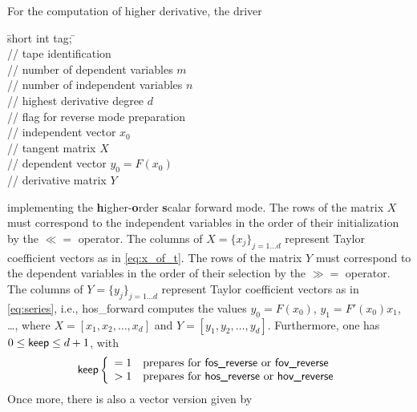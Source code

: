\documentclass[11pt,twoside]{article}
\begin{document}
For the computation of higher derivative, the driver
\begin{tabbing}
\hspace{0.5in}\={\sf short int tag;} \hspace{1.1in}\= \kill    %
\\
         \> // tape identification \\
                 \> // number of  dependent variables $m$\\
                 \> // number of independent variables $n$\\
                 \> // highest derivative degree $d$\\
              \> // flag for reverse mode preparation\\
          \> // independent vector $x_0$\\
        \> // tangent matrix $X$\\
          \> // dependent vector $y_0=F(x_0)$\\
        \> // derivative matrix $Y$
\end{tabbing}
implementing the  {\bf h}igher-{\bf o}rder {\bf s}calar forward mode.
The rows of the matrix $X$ must correspond to the independent variables in the order of their 
initialization by the \boldmath $\ll=$ \unboldmath operator. The columns of 
$X = \{x_j\}_{j=1\ldots d}$ represent Taylor coefficient vectors as in 
\eqref{eq:x_of_t}. The rows of the matrix $Y$ must correspond to the
dependent variables in the order of their selection by the \boldmath $\gg=$ \unboldmath operator.
The columns of $Y = \{y_j\}_{j=1\ldots d}$ represent 
Taylor coefficient vectors as in \eqref{eq:series}, i.e., {\sf hos\_forward}
computes the values
$y_0=F(x_0)$, $y_1=F'(x_0)x_1$, \ldots, where 
$X=[x_1,x_2,\ldots,x_d]$ and  $Y=[y_1,y_2,\ldots,y_d]$. Furthermore, one has
$0\leq\text{\sf keep}\leq d+1$, with
\begin{align*}
\text{\sf keep}  \left\{\begin{array}{cl}
       = 1 & \text{prepares for {\sf fos\_reverse} or {\sf fov\_reverse}} \\
       > 1 & \text{prepares for {\sf hos\_reverse} or {\sf hov\_reverse}}
       \end{array}\right.
\end{align*}
Once more, there is also a vector version given by
\end{document}
